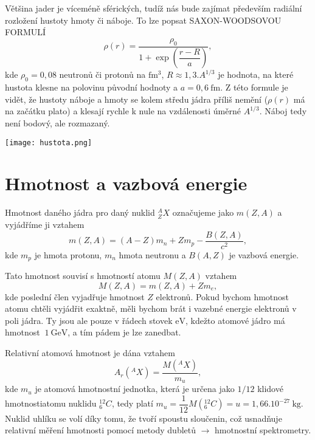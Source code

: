 \documentclass[../../main.tex]{subfiles}
\begin{document}
Většina jader je víceméně sférických, tudíž nás bude zajímat především radiální rozložení hustoty hmoty či náboje. To lze popsat SAXON-WOODSOVOU FORMULÍ
\begin{equation}
\rho (r) = \dfrac{\rho _0}{1 + \exp\left(\dfrac{r - R}{a}\right)},
\end{equation}
kde $\rho _0 = 0,08$ neutronů či protonů na $\mathrm{fm^3}$, $R \approx 1,3.A^{1/3}$ je hodnota, na které hustota klesne na polovinu původní hodnoty a $a = 0,6 ~\mathrm{fm}$. Z této formule je vidět, že hustoty náboje a hmoty se kolem středu jádra příliš nemění ($\rho (r)$ má na začátku plato) a klesají rychle k nule na vzdálenosti úměrné $A^{1/3}$. Náboj tedy není bodový, ale rozmazaný. 

\begin{center}
	\texttt{[image: hustota.png]}
\end{center}

\section{Hmotnost a vazbová energie}

Hmotnost daného jádra pro daný nuklid $^{A}_{Z} X$ označujeme jako $m(Z,A)$ a vyjádříme ji vztahem
\begin{equation}
m(Z, A) = (A-Z)m_n + Z m_p - \dfrac{B(Z,A)}{c^2}, 
\end{equation}
kde $m_p$ je hmota protonu, $m_n$ hmota neutronu a $B(A,Z)$ je vazbová energie. 

Tato hmotnost souvisí s hmotností atomu $M(Z,A)$ vztahem
\begin{equation}
M(Z,A) = m(Z,A) + Z m_e,
\end{equation}
kde poslední člen vyjadřuje hmotnost $Z$ elektronů. Pokud bychom hmotnost atomu chtěli vyjádřit exaktně, měli bychom brát i vazebné energie elektronů v poli jádra. Ty jsou ale pouze v řádech stovek $\mathrm{eV}$, kdežto atomové jádro má hmotnost $~ 1 ~\mathrm{GeV}$, a tím pádem je lze zanedbat. 

Relativní atomová hmotnost je dána vztahem
\begin{equation}
A_r (^{A} X) = \dfrac{M(^{A} X)}{m_u},
\end{equation}
kde $m_u$ je atomová hmotnostní jednotka, která je určena jako $1/12$ klidové hmotnostiatomu nuklidu $^{12}_{6} C$, tedy platí $m_u = \dfrac{1}{12} M(^{12}_{6}C) = u = 1,66.10^{-27} ~\mathrm{kg}$. Nuklid uhlíku se volí díky tomu, že tvoří spoustu sloučenin, což usnadňuje relativní měření hmotnosti pomocí metody dubletů $\rightarrow$ hmotnostní spektrometry.
\end{document}
